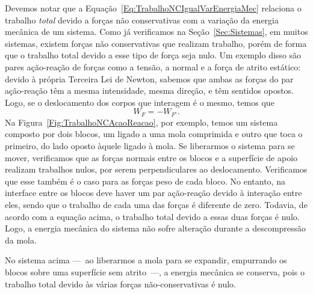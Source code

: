 Devemos notar que a Equação~\eqref{Eq:TrabalhoNCIgualVarEnergiaMec} relaciona o trabalho \emph{total} devido a forças não conservativas com a variação da energia mecânica de um sistema. Como já verificamos na Seção~\ref{Sec:Sistemas}, em muitos sistemas, existem forças não conservativas que realizam trabalho, porém de forma que o trabalho total devido a esse tipo de força seja nulo. Um exemplo disso são pares ação-reação de forças como a tensão, a normal e a força de atrito estático: devido à própria Terceira Lei de Newton, sabemos que ambas as forças do par ação-reação têm a mesma intensidade, mesma direção, e têm sentidos opostos. Logo, se o deslocamento dos corpos que interagem é o mesmo, temos que
\begin{equation}\label{Eq:RelTrabParAcaoReacao}
    W_{F} = -W_{F'}.
\end{equation}
%
Na Figura~\ref{Fig:TrabalhoNCAcaoReacao}, por exemplo, temos um sistema composto por dois blocos, um ligado a uma mola comprimida e outro que toca o primeiro, do lado oposto àquele ligado à mola. Se liberarmos o sistema para se mover, verificamos que as forças normais entre os blocos e a superfície de apoio realizam trabalhos nulos, por serem perpendiculares ao deslocamento. Verificamos que esse também é o caso para as forças peso de cada bloco. No entanto, na interface entre os blocos deve haver um par ação-reação devido à interação entre eles, sendo que o trabalho de cada uma das forças é diferente de zero. Todavia, de acordo com a equação acima, o trabalho total devido a essas duas forças é nulo. Logo, a energia mecânica do sistema não sofre alteração durante a descompressão da mola.
\begin{marginfigure}[-5cm]
\centering
{}
\caption{No sistema acima ---~ao liberarmos a mola para se expandir, empurrando os blocos sobre uma superfície sem atrito~---, a energia mecânica se conserva, pois o trabalho total devido às várias forças não-conservativas é nulo.\label{Fig:TrabalhoNCAcaoReacao}}
\end{marginfigure}

